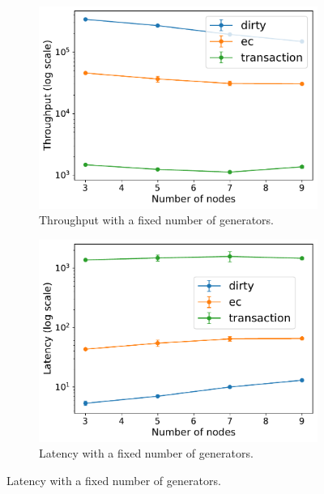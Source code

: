 \begin{figure}[htp]
  \centering
  \begin{subfigure}[t]{0.95\columnwidth}
    \centering
    \includegraphics[width=\columnwidth]{figures/tp_nodes_fixgen_caelum.pdf}
    \caption{Throughput with a fixed number of generators.}
    \label{fig:tp nodes fixgen caelum}
  \end{subfigure}
  
  \begin{subfigure}[t]{0.95\columnwidth}
    \centering
    \includegraphics[width=\columnwidth]{figures/lat_nodes_fixgen_caelum.pdf}
    \caption{Latency with a fixed number of generators.}
    \label{fig:lat nodes fixgen caelum}
  \end{subfigure}


\end{figure}
